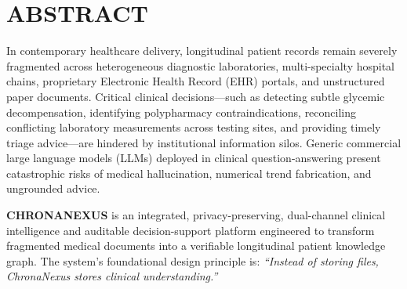\chapter*{ABSTRACT}

In contemporary healthcare delivery, longitudinal patient records remain severely fragmented across heterogeneous diagnostic laboratories, multi-specialty hospital chains, proprietary Electronic Health Record (EHR) portals, and unstructured paper documents. Critical clinical decisions---such as detecting subtle glycemic decompensation, identifying polypharmacy contraindications, reconciling conflicting laboratory measurements across testing sites, and providing timely triage advice---are hindered by institutional information silos. Generic commercial large language models (LLMs) deployed in clinical question-answering present catastrophic risks of medical hallucination, numerical trend fabrication, and ungrounded advice. 

\textbf{CHRONANEXUS} is an integrated, privacy-preserving, dual-channel clinical intelligence and auditable decision-support platform engineered to transform fragmented medical documents into a verifiable longitudinal patient knowledge graph. The system's foundational design principle is: \textit{``Instead of storing files, ChronaNexus stores clinical understanding.''}

